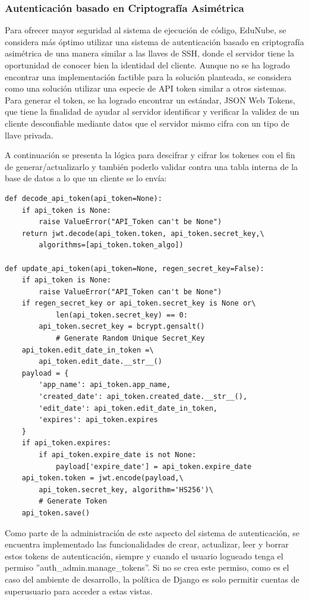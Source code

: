 \subsubsection{Autenticación basado en Criptografía Asimétrica}
Para ofrecer mayor seguridad al sistema de ejecución de código, EduNube, se considera más óptimo utilizar una sistema de autenticación basado en criptografía asimétrica de una manera similar a las llaves de SSH, donde el servidor tiene la oportunidad de conocer bien la identidad del cliente. Aunque no se ha logrado encontrar una implementación factible para la solución planteada, se considera como una solución utilizar una especie de API token similar a otros sistemas. Para generar el token, se ha logrado encontrar un estándar, JSON Web Tokens, que tiene la finalidad de ayudar al servidor identificar y verificar la validez de un cliente desconfiable mediante datos que el servidor mismo cifra con un tipo de llave privada.

A continuación se presenta la lógica para descifrar y cifrar los tokenes con el fin de generar/actualizarlo y también poderlo validar contra una tabla interna de la base de datos a lo que un cliente se lo envía:
\begin{lstlisting}
def decode_api_token(api_token=None):
    if api_token is None:
        raise ValueError("API_Token can't be None")
    return jwt.decode(api_token.token, api_token.secret_key,\
        algorithms=[api_token.token_algo])

def update_api_token(api_token=None, regen_secret_key=False):
    if api_token is None:
        raise ValueError("API_Token can't be None")
    if regen_secret_key or api_token.secret_key is None or\
            len(api_token.secret_key) == 0:
        api_token.secret_key = bcrypt.gensalt()
            # Generate Random Unique Secret_Key
    api_token.edit_date_in_token =\
        api_token.edit_date.__str__()
    payload = {
        'app_name': api_token.app_name,
        'created_date': api_token.created_date.__str__(),
        'edit_date': api_token.edit_date_in_token,
        'expires': api_token.expires
    }
    if api_token.expires:
        if api_token.expire_date is not None:
            payload['expire_date'] = api_token.expire_date
    api_token.token = jwt.encode(payload,\
        api_token.secret_key, algorithm='HS256')\
        # Generate Token
    api_token.save()
\end{lstlisting}

Como parte de la administración de este aspecto del sistema de autenticación, se encuentra implementado las funcionalidades de crear, actualizar, leer y borrar estos tokens de autenticación, siempre y cuando el usuario logueado tenga el permiso ''auth\_admin.manage\_tokens''. Si no se crea este permiso, como es el caso del ambiente de desarrollo, la política de Django es solo permitir cuentas de superusuario para acceder a estas vistas.

